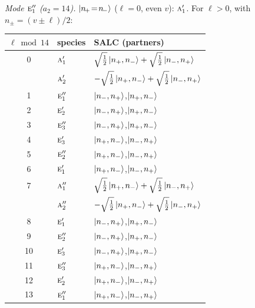 \documentclass[11pt]{article}
\newcommand{\irr}[1]{\text{\normalfont\scshape #1}}
\begin{document}
\emph{Mode $\irr{e}_{1}''$ ($a_2=14$).} $\ket{n_{\!+}\!=\!n_{\!-}}$ ($\ell=0$, even $v$): $\irr{a}_{1}'$. For $\ell>0$, with $n_\pm=(v\pm\ell)/2$:
\begin{longtable}{c l l}\hline $\ell\bmod 14$ & species & SALC (partners)\\ \hline\endhead
0 & $\irr{a}_{1}'$ & $\sqrt{\tfrac{1}{2}}\ket{n_+,n_-}+\sqrt{\tfrac{1}{2}}\ket{n_-,n_+}$\\
 & $\irr{a}_{2}'$ & $-\sqrt{\tfrac{1}{2}}\ket{n_+,n_-}+\sqrt{\tfrac{1}{2}}\ket{n_-,n_+}$\\
1 & $\irr{e}_{1}''$ & $\ket{n_-,n_+}$,\quad $\ket{n_+,n_-}$\\
2 & $\irr{e}_{2}'$ & $\ket{n_-,n_+}$,\quad $\ket{n_+,n_-}$\\
3 & $\irr{e}_{3}''$ & $\ket{n_-,n_+}$,\quad $\ket{n_+,n_-}$\\
4 & $\irr{e}_{3}'$ & $\ket{n_+,n_-}$,\quad $\ket{n_-,n_+}$\\
5 & $\irr{e}_{2}''$ & $\ket{n_+,n_-}$,\quad $\ket{n_-,n_+}$\\
6 & $\irr{e}_{1}'$ & $\ket{n_+,n_-}$,\quad $\ket{n_-,n_+}$\\
7 & $\irr{a}_{1}''$ & $\sqrt{\tfrac{1}{2}}\ket{n_+,n_-}+\sqrt{\tfrac{1}{2}}\ket{n_-,n_+}$\\
 & $\irr{a}_{2}''$ & $-\sqrt{\tfrac{1}{2}}\ket{n_+,n_-}+\sqrt{\tfrac{1}{2}}\ket{n_-,n_+}$\\
8 & $\irr{e}_{1}'$ & $\ket{n_-,n_+}$,\quad $\ket{n_+,n_-}$\\
9 & $\irr{e}_{2}''$ & $\ket{n_-,n_+}$,\quad $\ket{n_+,n_-}$\\
10 & $\irr{e}_{3}'$ & $\ket{n_-,n_+}$,\quad $\ket{n_+,n_-}$\\
11 & $\irr{e}_{3}''$ & $\ket{n_+,n_-}$,\quad $\ket{n_-,n_+}$\\
12 & $\irr{e}_{2}'$ & $\ket{n_+,n_-}$,\quad $\ket{n_-,n_+}$\\
13 & $\irr{e}_{1}''$ & $\ket{n_+,n_-}$,\quad $\ket{n_-,n_+}$\\
\hline\end{longtable}
\end{document}
